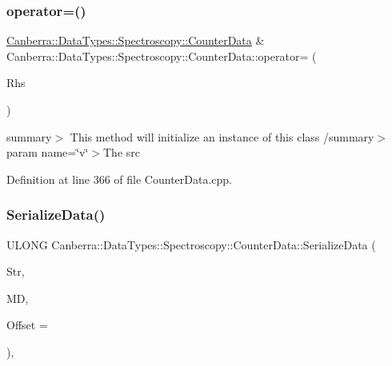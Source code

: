 \subsubsection{\texorpdfstring{operator=()}{operator=()}}
{\footnotesize\ttfamily \hyperlink{class_canberra_1_1_data_types_1_1_spectroscopy_1_1_counter_data}{Canberra\+::\+Data\+Types\+::\+Spectroscopy\+::\+Counter\+Data} \& Canberra\+::\+Data\+Types\+::\+Spectroscopy\+::\+Counter\+Data\+::operator= (\begin{DoxyParamCaption}\item[{const \hyperlink{class_canberra_1_1_data_types_1_1_spectroscopy_1_1_counter_data}{Counter\+Data} \&}]{Rhs }\end{DoxyParamCaption})}

summary$>$ This method will initialize an instance of this class /summary$>$ param name=\char`\"{}v\char`\"{}$>$The src

Definition at line 366 of file Counter\+Data.\+cpp.

\mbox{\label{class_canberra_1_1_data_types_1_1_spectroscopy_1_1_counter_data_a7cabd7795fc0bb4c0e3a2bb17acfb8c9_a7cabd7795fc0bb4c0e3a2bb17acfb8c9}} 
\subsubsection{\texorpdfstring{Serialize\+Data()}{SerializeData()}}
{\footnotesize\ttfamily U\+L\+O\+NG Canberra\+::\+Data\+Types\+::\+Spectroscopy\+::\+Counter\+Data\+::\+Serialize\+Data (\begin{DoxyParamCaption}\item[{\hyperlink{class_canberra_1_1_utility_1_1_core_1_1_byte_stream}{Canberra\+::\+Utility\+::\+Core\+::\+Byte\+Stream} \&}]{Str,  }\item[{const \hyperlink{class_canberra_1_1_serialization_1_1_meta_data}{Canberra\+::\+Serialization\+::\+Meta\+Data} \&}]{MD,  }\item[{const L\+O\+NG}]{Offset = {} }\end{DoxyParamCaption})\hspace{0.3cm}{\ttfamily [protected]}, {\ttfamily [virtual]}}

